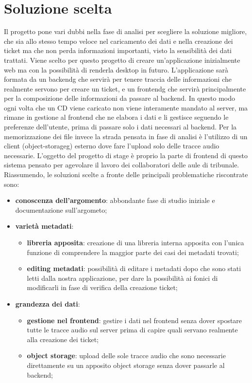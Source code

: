\section{Soluzione scelta}
Il progetto pone vari dubbi nella fase di analisi per scegliere la soluzione migliore, che sia allo stesso tempo veloce nel caricamento dei dati e nella creazione dei ticket ma
che non perda informazioni importanti, visto la sensibilità dei dati trattati. Viene scelto per questo progetto di creare un'applicazione inizialmente web ma con la possibilità
di renderla desktop in futuro. L'applicazione sarà formata da un \gls{backendg} che servirà per tenere traccia delle informazioni che realmente servono per creare un ticket, e un \gls{frontendg}
che servirà principalmente per la composizione delle informazioni da passare al backend.
In questo modo ogni volta che un CD viene caricato non viene interamente mandato al server, ma rimane in gestione al frontend che ne elabora i dati e li gestisce seguendo le preferenze
dell'utente, prima di passare solo i dati necessari al backend. Per la memorizzazione dei file invece la strada pensata in fase di analisi è l'utilizzo di un client (\gls{object-storageg})
esterno dove fare l'upload solo delle tracce audio necessarie. L'oggetto del progetto di stage è proprio la parte di frontend di questo sistema pensato per agevolare il lavoro dei
collaboratori delle aule di tribunale. Riassumendo, le soluzioni scelte a fronte delle principali problematiche riscontrate sono:
\begin{itemize}
  \item \textbf{conoscenza dell'argomento}: abbondante fase di studio iniziale e documentazione sull'argometo;
  \item \textbf{varietà metadati}:
        \begin{itemize}
          \item \textbf{libreria apposita}: creazione di una libreria interna apposita con l'unica funzione di comprendere la maggior parte dei casi dei metadati trovati;
          \item \textbf{editing metadati}: possibilità di editare i metadati dopo che sono stati letti dalla nostra applicazione, per dare la possibilità ai fonici di modificarli in fase di verifica della creazione ticket;
        \end{itemize}
  \item \textbf{grandezza dei dati}:
        \begin{itemize}
          \item \textbf{gestione nel frontend}: gestire i dati nel frontend senza dover spostare tutte le tracce audio sul server prima di capire quali servano realmente alla creazione dei ticket;
          \item \textbf{object storage}: upload delle sole tracce audio che sono necessarie direttamente su un apposito object storage senza dover passarle al backend;
        \end{itemize}
\end{itemize}

